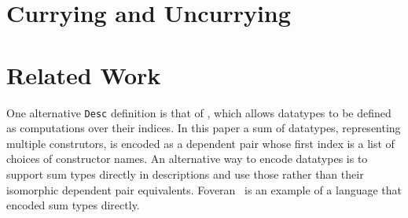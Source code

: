 \documentclass[preprint,nonatbib]{sigplanconf}
\begin{document}
\section{Currying and Uncurrying}
\label{sec:curry}


\section{Related Work}
\label{sec:related-work}

One alternative {\tt Desc} definition is that of \citet{dagand:phd}, which
allows datatypes to be defined as computations over their indices.
In this paper a sum of datatypes, representing multiple construtors,
is encoded as a dependent pair whose first index is a list of choices
of constructor names. An alternative way to encode datatypes is to
support sum types directly in descriptions and use those rather than
their isomorphic dependent pair equivalents. Foveran~\citep{foveran} is
an example of a language that encoded sum types directly.


\clearpage

\acks




\end{document}
